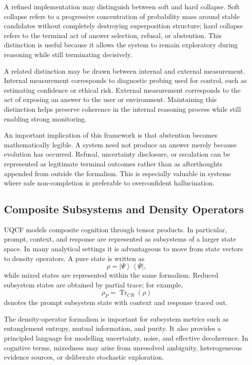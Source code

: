\documentclass[12pt]{article}
\newcommand{\ket}[1]{\left|#1\right\rangle}
\newcommand{\bra}[1]{\left\langle#1\right|}
\newcommand{\Tr}{\operatorname{Tr}}
\begin{document}
A refined implementation may distinguish between soft and hard collapse. Soft collapse refers to a progressive concentration of probability mass around stable candidates without completely destroying superposition structure; hard collapse refers to the terminal act of answer selection, refusal, or abstention. This distinction is useful because it allows the system to remain exploratory during reasoning while still terminating decisively.

A related distinction may be drawn between internal and external measurement. Internal measurement corresponds to diagnostic probing used for control, such as estimating confidence or ethical risk. External measurement corresponds to the act of exposing an answer to the user or environment. Maintaining this distinction helps preserve coherence in the internal reasoning process while still enabling strong monitoring.

An important implication of this framework is that abstention becomes mathematically legible. A system need not produce an answer merely because evolution has occurred. Refusal, uncertainty disclosure, or escalation can be represented as legitimate terminal outcomes rather than as afterthoughts appended from outside the formalism. This is especially valuable in systems where safe non-completion is preferable to overconfident hallucination.

\subsection{Composite Subsystems and Density Operators}
UQCF models composite cognition through tensor products. In particular, prompt, context, and response are represented as subsystems of a larger state space. In many analytical settings it is advantageous to move from state vectors to density operators. A pure state is written as
\begin{equation}
\rho = \ket{\Psi}\bra{\Psi},
\end{equation}
while mixed states are represented within the same formalism. Reduced subsystem states are obtained by partial trace; for example,
\begin{equation}
\rho_P = \Tr_{CR}(\rho)
\end{equation}
denotes the prompt subsystem state with context and response traced out.

The density-operator formalism is important for subsystem metrics such as entanglement entropy, mutual information, and purity. It also provides a principled language for modelling uncertainty, noise, and effective decoherence. In cognitive terms, mixedness may arise from unresolved ambiguity, heterogeneous evidence sources, or deliberate stochastic exploration.
\end{document}
